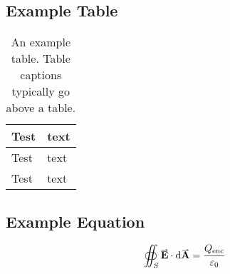 \documentclass[a4paper, 12pt, english]{article}
\begin{document}
            \FloatBarrier

        \subsection{Example Table}
            \label{app: example table}

            \begin{table}[!h]
                \centering
                \caption{An example table. Table captions typically go above a table.}
                \label{table: example}
                \begin{tabular}{ |C{0.2\textwidth}|m{0.2\textwidth}| }
                    \hline
                    Test & text\\
                    \hline
                    \hline
                    Test & text\\
                    \hline
                    Test & text\\
                    \hline
                \end{tabular}
            \end{table}

        \subsection{Example Equation}
            \label{app: example equation}

            \begin{equation}
                \oiint_S \vect{E} \cdot \d\vect{A} = \frac{Q_{\text{enc}}}{\varepsilon_0}
                \label{eq: Gauss Law}
            \end{equation}

            
            
\end{document}
